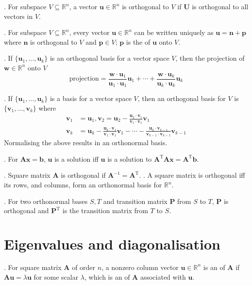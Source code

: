 \documentclass{slnotes}
\newcommand*{\TT}{\mathrm{T}}
\begin{document}
. For subspace \(V \subseteq \mathbb{R}^n\), a vector \(\mathbf{u} \in \mathbb{R}^n\) is orthogonal to \(V\) if \(\mathbf{U}\) is orthogonal to all vectors in \(V\).

. For subspace \(V \subseteq \mathbb{R}^n\), every vector \(\mathbf{u} \in \mathbb{R}^n\) can be written uniquely as \(\mathbf{u} = \mathbf{n} + \mathbf{p}\) where \(\mathbf{n}\) is orthogonal to \(V\) and \(\mathbf{p} \in V\); \(\mathbf{p}\) is the  of \(\mathbf{u}\) onto \(V\).

. If \(\{\mathbf{u}_1, \hdots, \mathbf{u}_k\}\) is an orthogonal basis for a vector space \(V\), then the projection of \(\mathbf{w} \in \mathbb{R}^n\) onto \(V\) \[\text{projection} = \frac{\mathbf{w}\cdot\mathbf{u}_1}{\mathbf{u}_1\cdot\mathbf{u}_1}\mathbf{u}_1 + \cdots + \frac{\mathbf{w}\cdot\mathbf{u}_k}{\mathbf{u}_k\cdot\mathbf{u}_k}\mathbf{u}_k\]

. If \(\{\mathbf{u}_1, \hdots, \mathbf{u}_k\}\) is a basis for a vector space \(V\), then an orthogonal basis for \(V\) is \(\{\mathbf{v}_1, \hdots, \mathbf{v}_k\}\) where \begin{align*}
\mathbf{v}_1 &= \mathbf{u}_1, \mathbf{v}_2 = \mathbf{u}_2 - \frac{\mathbf{u}_2 \cdot \mathbf{v}_1}{\mathbf{v}_1 \cdot \mathbf{v}_1}\mathbf{v}_1\\
\mathbf{v}_k &= \mathbf{u}_k - \frac{\mathbf{u}_k \cdot \mathbf{v}_1}{\mathbf{v}_1 \cdot \mathbf{v}_1}\mathbf{v}_1 - \cdots - \frac{\mathbf{u}_k \cdot \mathbf{v}_{k-1}}{\mathbf{v}_{k-1} \cdot \mathbf{v}_{k-1}}\mathbf{v}_{k-1}
\end{align*}
Normalising the above results in an orthonormal basis.

. For \(\mathbf{Ax} = \mathbf{b}\), \(\mathbf{u}\) is a  solution iff \(\mathbf{u}\) is a solution to \(\mathbf{A}^\TT\mathbf{Ax} = \mathbf{A}^\TT\mathbf{b}\).

. Square matrix \(\mathbf A\) is orthogonal if \(\mathbf{A}^{-1} = \mathbf{A}^\TT\). . A square matrix is orthogonal iff its rows, and columns, form an orthonormal basis for \(\mathbb R^n\).

. For two orthonormal bases \(S, T\) and transition matrix \(\mathbf P\) from \(S\) to \(T\), \(\mathbf P\) is orthogonal and \(\mathbf P^\TT\) is the transition matrix from \(T\) to \(S\).

\chapter{Eigenvalues and diagonalisation}
. For square matrix \(\mathbf A\) of order \(n\), a nonzero column vector \(\mathbf u \in \mathbb{R}^n\) is an  of \(\mathbf A\) if \(\mathbf{Au} = \lambda\mathbf{u}\) for some scalar \(\lambda\), which is an  of \(\mathbf A\) associated with \(\mathbf u\).
\end{document}

